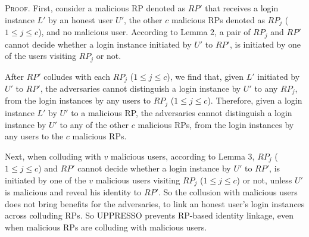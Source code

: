 {{%


\vspace{0.75mm}
\noindent\textsc{Proof.}
%
First, consider a malicious RP denoted as $RP'$ that receives a login instance $L'$ by an honest user $U'$,
    the other $c$ malicious RPs denoted as $RP_j$ ($1 \leq j \leq c$), and no malicious user.
According to Lemma 2, a pair of $RP_j$ and $RP'$ cannot decide whether a login instance initiated by $U'$ to $RP'$,
        is initiated by one of the users visiting $RP_j$ or not.

After $RP'$ colludes with each $RP_j$ ($1 \leq j \leq c$),
  we find that, given $L'$ initiated by $U'$ to $RP'$,
    the adversaries cannot distinguish a login instance by $U'$ to any $RP_j$,
        from the login instances by any users to $RP_j$ ($1 \leq j \leq c$).
Therefore, given a login instance $L'$ by $U'$ to a malicious RP,
    the adversaries cannot distinguish a login instance by $U'$ to any of the other $c$ malicious RPs,
        from the login instances by any users to the $c$ malicious RPs.

Next, when colluding with $v$ malicious users,
    according to Lemma 3,
    $RP_j$ ($1 \leq j \leq c$) and $RP'$ cannot decide whether a login instance by $U'$ to $RP'$,
        is initiated by one of the $v$ malicious users visiting $RP_j$ ($1 \leq j \leq c$) or not,
 unless $U'$ is malicious and reveal his identity to $RP'$.
So the collusion with malicious users does not bring benefits for the adversaries,
    to link an honest user's login instances across colluding RPs.
So UPPRESSO prevents RP-based identity linkage, even when malicious RPs are colluding with malicious users.

}}
